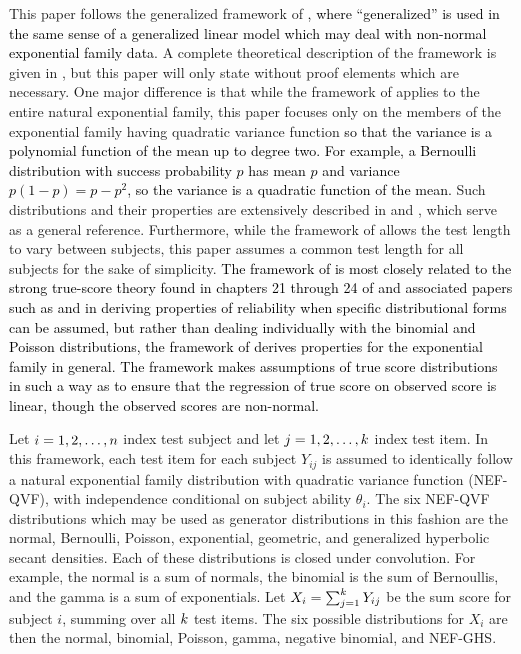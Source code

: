 \documentclass[12pt,epsfig]{article}
\newcommand{\changed}[1]{\textcolor{black}{#1}}
\newcommand{\numsubjects}{\changed{n}}%
\newcommand{\testlength}{\changed{k}}%
\begin{document}
This paper follows the generalized framework of \cite{Foster2020}\changed{, where ``generalized'' is used in the same sense of a generalized linear model which may deal with non-normal exponential family data}. A complete theoretical description of the framework is given in \cite{Foster2020}, but this paper will only state without proof elements which are necessary. One major difference is that while the framework of \cite{Foster2020} applies to the entire natural exponential family, this paper focuses only on the members of the exponential family having quadratic variance function \changed{so that the variance is a polynomial function of the mean up to degree two. For example, a Bernoulli distribution with success probability $p$ has mean $p$ and variance $p(1-p) = p - p^2$, so the variance is a quadratic function of the mean.} Such distributions and their properties are extensively described in \cite{Morris1982} and \cite{Morris1983}, which serve as a general reference. Furthermore, while the framework of \cite{Foster2020} allows the test length to vary between subjects, this paper assumes a common test length for all subjects for the sake of simplicity. \changed{The framework of \cite{Foster2020} is most closely related to the strong true-score theory found in chapters 21 through 24 of \cite{Lord1968} and associated papers such as \cite{Lord1965} and \cite{Keats1962} in deriving properties of reliability when specific distributional forms can be assumed, but rather than dealing  individually with the binomial and Poisson distributions, the framework of \cite{Foster2020} derives properties for the exponential family in general. The framework makes assumptions of true score distributions in such a way as to ensure that the regression of true score on observed score is linear, though the observed scores are non-normal.}

Let $i = 1, 2, \ldots, \numsubjects$ index test subject and let $j = 1, 2, \ldots, \testlength$ index test item. In this framework, each test item for each subject $Y_{ij}$ is assumed to identically follow a natural exponential family distribution with quadratic variance function (NEF-QVF), with independence conditional on subject ability $\theta_i$. The six NEF-QVF distributions which may be used as generator distributions in this fashion are the normal, Bernoulli, Poisson, exponential, geometric, and generalized hyperbolic secant densities. Each of these distributions is closed under convolution. For example, the normal is a sum of normals, the binomial is the sum of Bernoullis, and the gamma is a sum of exponentials. Let $X_i = \sum_{j = 1}^{\testlength} Y_{ij}$ be the sum score for subject $i$, summing over all $\testlength$ test items. The six possible distributions for $X_i$ are then the normal, binomial, Poisson, gamma, negative binomial, and NEF-GHS.
\end{document}
